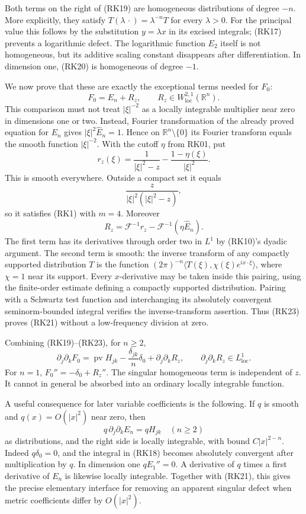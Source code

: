 \documentclass[
  11pt,
]{article}
\begin{document}
Both terms on the right of (RK19) are homogeneous distributions of
degree \(-n\). More explicitly, they satisfy
\(T(\lambda\,\cdot)=\lambda^{-n}T\) for every \(\lambda>0\). For the
principal value this follows by the substitution \(y=\lambda x\) in its
excised integrals; (RK17) prevents a logarithmic defect. The logarithmic
function \(E_2\) itself is not homogeneous, but its additive scaling
constant disappears after differentiation. In dimension one, (RK20) is
homogeneous of degree \(-1\).

We now prove that these are exactly the exceptional terms needed for
\(F_0\): \[
 F_0=E_n+R_z,\qquad R_z\in W_{\mathrm{loc}}^{2,1}(\mathbb R^n).
 \tag{RK21}
\] This comparison must not treat \(|\xi|^{-2}\) as a locally integrable
multiplier near zero in dimensions one or two. Instead, Fourier
transformation of the already proved equation for \(E_n\) gives
\(|\xi|^2\widehat E_n=1\). Hence on \(\mathbb R^n\setminus\{0\}\) its
Fourier transform equals the smooth function \(|\xi|^{-2}\). With the
cutoff \(\eta\) from RK01, put \[
 r_z(\xi)=\frac1{|\xi|^2-z}-\frac{1-\eta(\xi)}{|\xi|^2}.
 \tag{RK22}
\] This is smooth everywhere. Outside a compact set it equals \[
 \frac{z}{|\xi|^2(|\xi|^2-z)},
\] so it satisfies (RK1) with \(m=4\). Moreover \[
 R_z=\mathcal F^{-1}r_z-\mathcal F^{-1}(\eta\widehat E_n).
 \tag{RK23}
\] The first term has its derivatives through order two in \(L^1\) by
(RK10)'s dyadic argument. The second term is smooth: the inverse
transform of any compactly supported distribution \(T\) is the function
\((2\pi)^{-n}\langle T(\xi),\chi(\xi)e^{ix\cdot\xi}\rangle\), where
\(\chi=1\) near its support. Every \(x\)-derivative may be taken inside
this pairing, using the finite-order estimate defining a compactly
supported distribution. Pairing with a Schwartz test function and
interchanging its absolutely convergent seminorm-bounded integral
verifies the inverse-transform assertion. Thus (RK23) proves (RK21)
without a low-frequency division at zero.

Combining (RK19)--(RK23), for \(n\geq2\), \[
 \partial_j\partial_kF_0
 =\operatorname{pv}H_{jk}-\frac{\delta_{jk}}n\delta_0
  +\partial_j\partial_kR_z,\qquad
 \partial_j\partial_kR_z\in L^1_{\mathrm{loc}}.
 \tag{RK24}
\] For \(n=1\), \(F_0''=-\delta_0+R_z''\). The singular homogeneous term
is independent of \(z\). It cannot in general be absorbed into an
ordinary locally integrable function.

A useful consequence for later variable coefficients is the following.
If \(q\) is smooth and \(q(x)=O(|x|^2)\) near zero, then \[
 q\,\partial_j\partial_kE_n=qH_{jk}
 \quad(n\geq2)
 \tag{RK25}
\] as distributions, and the right side is locally integrable, with
bound \(C|x|^{2-n}\). Indeed \(q\delta_0=0\), and the integral in (RK18)
becomes absolutely convergent after multiplication by \(q\). In
dimension one \(qE_1''=0\). A derivative of \(q\) times a first
derivative of \(E_n\) is likewise locally integrable. Together with
(RK21), this gives the precise elementary interface for removing an
apparent singular defect when metric coefficients differ by
\(O(|x|^2)\).
\end{document}
